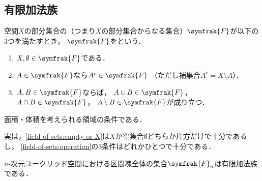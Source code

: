 \documentclass[../sotsu.tex]{subfiles}
\begin{document}
\subsection{有限加法族}

\begin{definition}
    \label{dfn:finitely-additive-class}
    空間$X$の部分集合の（つまり$X$の部分集合からなる集合）$\symfrak{F}$が以下の3つを満たすとき，
    $\symfrak{F}$をという．
    \begin{enumerate}
        \item \label{field-of-sets:empty-or-X}
            $X, \emptyset \in \symfrak{F}$である．
        \item \label{field-of-sets:complementation}
            $A \in \symfrak{F}$なら$A^{\mathrm{c}} \in \symfrak{F}$
            （ただし補集合$A^{\mathrm{c}} = X \setminus A$）．
        \item \label{field-of-sets:operation} 
            $A, B \in \symfrak{F}$ならば，
            $A \cup B \in \symfrak{F}$，
            $A \cap B \in \symfrak{F}$，
            $A \setminus B \in \symfrak{F}$が成り立つ．
    \end{enumerate}
\end{definition}

面積・体積を考えられる領域の条件である．

実は，\cref{field-of-sets:empty-or-X}は$X$か空集合$\emptyset$どちらか片方だけで十分であるし，
\cref{field-of-sets:operation}の3条件はどれかひとつで十分である．

\begin{example}
    $n$-次元ユークリッド空間における区間塊全体の集合$\symfrak{F}_n$は有限加法族である\cite[\S 4]{ito-lebesgue-1963}．
\end{example}
\end{document}
